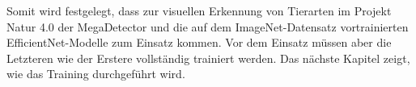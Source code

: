 
Somit wird festgelegt, dass zur visuellen Erkennung von Tierarten im Projekt Natur 4.0 der MegaDetector und die auf dem ImageNet-Datensatz vortrainierten EfficientNet-Modelle zum Einsatz kommen. Vor dem Einsatz müssen aber die Letzteren wie der Erstere vollständig trainiert werden. Das nächste Kapitel zeigt, wie das Training durchgeführt wird.
